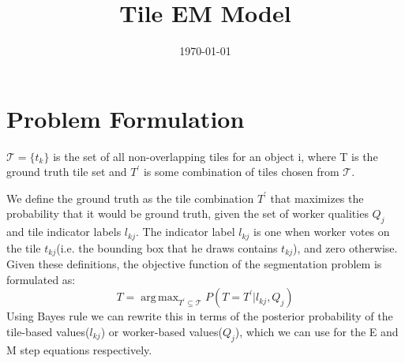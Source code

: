 \documentclass[12pt]{article}
\DeclareMathOperator*{\argmax}{arg\,max}
\begin{document}
\title{Tile EM Model}
\author{\today}
\date{}
\vspace{-50pt}
\maketitle
\vspace{-70pt}
\section{Problem Formulation}
\par $\mathcal{T}=\{t_k\}$ is the set of all non-overlapping tiles for an object i, where T is the ground truth tile set and $T^\prime$ is some combination of tiles chosen from $\mathcal{T}$.
\par We define the ground truth as the tile combination $T^\prime$ that maximizes the probability that it would be ground truth, given the set of worker qualities $Q_j$ and tile indicator labels $l_{kj}$.  The indicator label $l_{kj}$ is one when worker votes on the tile $t_{kj}$(i.e. the bounding box that he draws contains $t_{kj}$), and zero otherwise. Given these definitions, the objective function of the segmentation problem is formulated as: 
\begin{equation}
T = \argmax_{T^\prime \subseteq \mathcal{T}}P(T=T^\prime | l_{kj},Q_j)
\label{objective}
\end{equation}
Using Bayes rule we can rewrite this in terms of the posterior probability of the tile-based values($l_{kj}$) or worker-based values($Q_{j}$), which we can use for the E and M step equations respectively.
\end{document}
